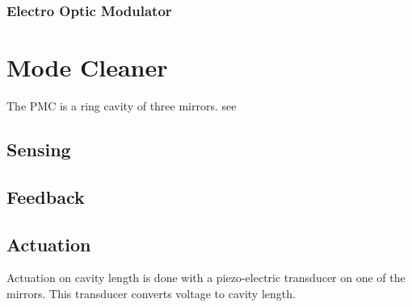 
%

\subsubsection{Electro Optic Modulator}

\section{Mode Cleaner}
The PMC is a ring cavity of three mirrors.
see  \cite{Willke:98}


\subsection{Sensing}

\subsection{Feedback}

\subsection{Actuation}
Actuation on cavity length is done with a piezo-electric transducer on one of
the mirrors. This transducer converts voltage to cavity length.

